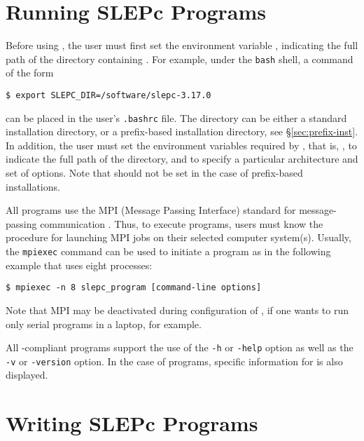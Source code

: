 
\section{Running SLEPc Programs}

Before using \slepc, the user must first set the environment variable
, indicating the full path of the directory containing \slepc. For example, under the \texttt{bash} shell, a command of the form
	\begin{Verbatim}[fontsize=\small]
	$ export SLEPC_DIR=/software/slepc-3.17.0
	\end{Verbatim}
can be placed in the user's \Verb!.bashrc! file.
The  directory can be either a standard installation \slepc directory, or a prefix-based installation directory, see \S\ref{sec:prefix-inst}.
In addition, the user must set the environment variables required by \petsc, that is, , to indicate the full path of the \petsc directory, and  to specify a particular architecture and set of options. Note that  should not be set in the case of prefix-based installations.

All \petsc programs use the MPI (Message Passing Interface) standard
for message-passing communication \citep{MPI-Forum:1994:MMI}.  Thus, to execute
\slepc programs, users must know the procedure for launching MPI jobs
on their selected computer system(s).  Usually, the \texttt{mpiexec} command can be used to initiate a program as in the following example that uses eight processes:
	\begin{Verbatim}[fontsize=\small]
	$ mpiexec -n 8 slepc_program [command-line options]
	\end{Verbatim}
Note that MPI may be deactivated during configuration of \petsc, if one wants to run only serial programs in a laptop, for example.

All \petsc-compliant programs support the use of the \Verb!-h!
or \Verb!-help! option as well as the \Verb!-v! or \Verb!-version! option. In the case of \slepc programs, specific information for \slepc is also displayed.

\section{Writing SLEPc Programs}

